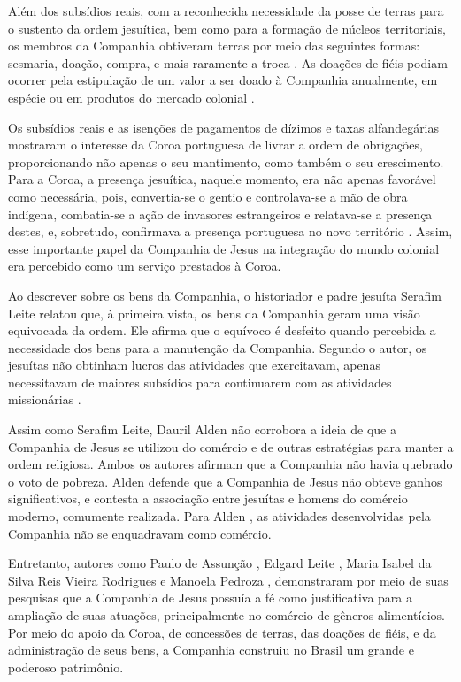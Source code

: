 Além dos subsídios reais, com a reconhecida necessidade da posse de terras para o sustento da ordem jesuítica, bem como para a formação de núcleos territoriais, os membros da Companhia obtiveram terras por meio das seguintes formas: sesmaria, doação, compra, e mais raramente a troca \cite[p.~12]{Alveal2002}. As doações de fiéis podiam ocorrer pela estipulação de um valor a ser doado à Companhia anualmente, em espécie ou em produtos do mercado colonial \cite[p.~81]{Assuncao2004}. 

Os subsídios reais e as isenções de pagamentos de dízimos e taxas alfandegárias mostraram o interesse da Coroa portuguesa de livrar a ordem de obrigações, proporcionando não apenas o seu mantimento, como também o seu crescimento. Para a Coroa, a presença jesuítica, naquele momento, era não apenas favorável como necessária, pois, convertia-se o gentio e controlava-se a mão de obra indígena, combatia-se a ação de invasores estrangeiros e relatava-se a presença destes, e, sobretudo, confirmava a presença portuguesa no novo território \cite[p.~156]{Assuncao2004}. Assim, esse importante papel da Companhia de Jesus na integração do mundo colonial era percebido como um serviço prestados à Coroa. 

Ao descrever sobre os bens da Companhia, o historiador e padre jesuíta Serafim Leite relatou que, à primeira vista, os bens da Companhia geram uma visão equivocada da ordem. Ele afirma que o equívoco é desfeito quando percebida a necessidade dos bens para a manutenção da Companhia. Segundo o autor, os jesuítas não obtinham lucros das atividades que exercitavam, apenas necessitavam de maiores subsídios para continuarem com as atividades missionárias \cite[Tombo~I,~p.~49]{Leite2004}.

Assim como Serafim Leite, Dauril Alden não corrobora a ideia de que a Companhia de Jesus se utilizou do comércio e de outras estratégias para manter a ordem religiosa. Ambos os autores afirmam que a Companhia não havia quebrado o voto de pobreza. Alden defende que a Companhia de Jesus não obteve ganhos significativos, e contesta a associação entre jesuítas e homens do comércio moderno, comumente realizada. Para Alden \citeyear[p.~527]{Alden1996}, as atividades desenvolvidas pela Companhia não se enquadravam como comércio.  

Entretanto, autores como Paulo de Assunção \citeyear{Assuncao2004}, Edgard Leite \citeyear{Leite2000}, Maria Isabel da Silva Reis Vieira Rodrigues \citeyear{Rodrigues1997} e Manoela Pedroza \citeyear{Pedroza2020}, demonstraram por meio de suas pesquisas que a Companhia de Jesus possuía a fé como justificativa para a ampliação de suas atuações, principalmente no comércio de gêneros alimentícios. Por meio do apoio da Coroa, de concessões de terras, das doações de fiéis, e da administração de seus bens, a Companhia construiu no Brasil um grande e poderoso patrimônio.   

